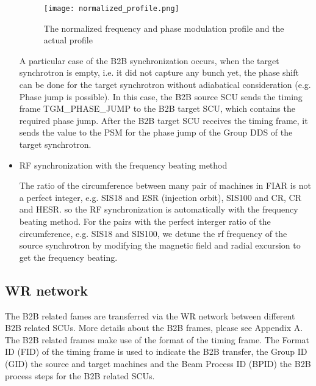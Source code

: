 \begin{itemize}
\begin{figure}[!htb]
   \centering   
   \texttt{[image: normalized\_profile.png]}
   \caption{The normalized frequency and phase modulation profile and the actual profile}
   \label{normalized_profile}
\end{figure}  

A particular case of the B2B synchronization occurs, when the target synchrotron is empty, i.e. it did not capture any bunch yet, the phase shift can be done for the target synchrotron without adiabatical consideration (e.g. Phase jump is possible). In this case, the B2B source SCU sends the timing frame TGM\_PHASE\_JUMP to the B2B target SCU, which contains the required phase jump. After the B2B target SCU receives the timing frame, it sends the value to the PSM for the phase jump of the Group DDS of the target synchrotron. 

\item RF synchronization with the frequency beating method

The ratio of the circumference between many pair of machines in FIAR is not a perfect integer, e.g. SIS18 and ESR (injection orbit), SIS100 and CR, CR and HESR. so the RF synchronization is automatically with the frequency beating method. For the pairs with the perfect interger ratio of the circumference, e.g. SIS18 and SIS100, we detune the rf frequency of the source synchrotron by modifying the magnetic field and radial excursion to get the frequency beating.

\end{itemize}

\subsection{WR network}

The B2B related fames are transferred via the WR network between different B2B related SCUs. More details about the B2B frames, please see Appendix A. The B2B related frames make use of the format of the timing frame. The Format ID (\gls{FID}) of the timing frame is used to indicate the B2B transfer, the Group ID (\gls{GID}) the source and target machines and the Beam Process ID (\gls{BPID}) the B2B process steps for the B2B related SCUs. 
